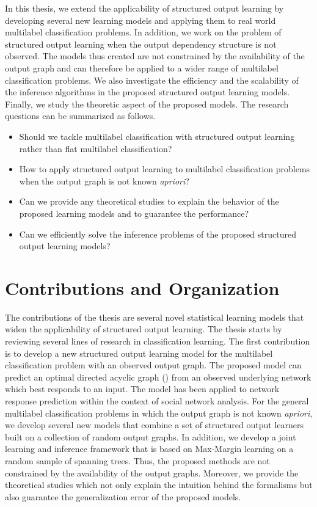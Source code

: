 In this thesis, we extend the applicability of structured output learning by developing several new learning models and applying them to real world multilabel classification problems.
In addition, we work on the problem of structured output learning when the output dependency structure is not observed.
The models thus created are not constrained by the availability of the output graph and can therefore be applied to a wider range of multilabel classification problems.
We also investigate the efficiency and the scalability of the inference algorithms in the proposed structured output learning models.
Finally, we study the theoretic aspect of the proposed models.
The research questions can be summarized as follows.
\begin{itemize}
\item Should we tackle multilabel classification with structured output learning rather than flat multilabel classification?
\item How to apply structured output learning to multilabel classification problems when the output graph is not known \textit{apriori}?
\item Can we provide any theoretical studies to explain the behavior of the proposed learning models and to guarantee the performance?
\item Can we efficiently solve the inference problems of the proposed structured output learning models?
\end{itemize}



%
%
\section{Contributions and Organization}

The contributions of the thesis are several novel statistical learning models that widen the applicability of structured output learning.
The thesis starts by reviewing several lines of research in classification learning.
The first contribution is to develop a new structured output learning model for the multilabel classification problem with an observed output graph.
The proposed model can predict an optimal directed acyclic graph (\daggraph) from an observed underlying network which best responds to an input.
The model has been applied to network response prediction within the context of social network analysis.
For the general multilabel classification problems in which the output graph is not known \textit{apriori}, we develop several new models that combine a set of structured output learners built on a collection of random output graphs.
In addition, we develop a joint learning and inference framework that is based on Max-Margin learning on a random sample of spanning trees.
Thus, the proposed methods are not constrained by the availability of the output graphs.
Moreover, we provide the theoretical studies which not only explain the intuition behind the formalisms but also guarantee the generalization error of the proposed models.

